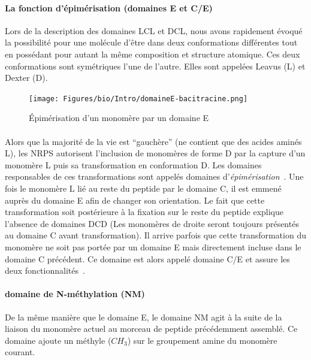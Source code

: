 \documentclass[12pt,french,twoside]{report}
\begin{document}
\paragraph{La fonction d'épimérisation (domaines E et C/E)}

Lors de la description des domaines LCL et DCL, nous avons rapidement évoqué la possibilité pour une molécule d'être dans deux conformations différentes tout en possédant pour autant la même composition et structure atomique.
Ces deux conformations sont symétriques l'une de l'autre.
Elles sont appelées Leavus (L) et Dexter (D).

\begin{figure}[h!]
  \begin{center}
    \texttt{[image: Figures/bio/Intro/domaineE-bacitracine.png]}
    \caption{\label{domaine_E}Épimérisation d'un monomère par un domaine E}
  \end{center}
\end{figure}

\paragraph{}Alors que la majorité de la vie est ``gauchère'' (ne contient que des acides aminés L), les NRPS autorisent l'inclusion de monomères de forme D par la capture d'un monomère L puis sa transformation en conformation D.
Les domaines responsables de ces transformations sont appelés domaines d'\textit{épimérisation}~\cite{calcott_portability_2015}.
Une fois le monomère L lié au reste du peptide par le domaine C, il est emmené auprès du domaine E afin de changer son orientation.
Le fait que cette transformation soit postérieure à la fixation sur le reste du peptide explique l'absence de domaines DCD (Les monomères de droite seront toujours présentés au domaine C avant transformation).
Il arrive parfois que cette transformation du monomère ne soit pas portée par un domaine E mais directement incluse dans le domaine C précédent.
Ce domaine est alors appelé domaine C/E et assure les deux fonctionnalités~\cite{yin_enduracidin_2006,balibar_generation_2005}.


\paragraph{domaine de N-méthylation (NM)}

De la même manière que le domaine E, le domaine NM agit à la suite de la liaison du monomère actuel au morceau de peptide précédemment assemblé.
Ce domaine ajoute un méthyle ($CH_{3}$) sur le groupement amine du monomère courant.
\end{document}

